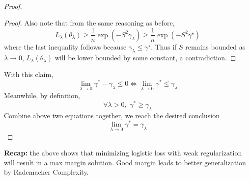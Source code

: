 \documentclass[11pt]{article}
\theoremstyle{definition}
\theoremstyle{remark}
\begin{document}
\begin{proof}
\begin{proof}
Also note that from the same reasoning as before, $$L_{\lambda}(\theta_{\lambda}) \ge \frac{1}{n} \exp(-S^2 \gamma_{\lambda}) \ge \frac{1}{n} \exp(-S^2 \gamma^\star)$$ where the last inequality follows because $\gamma_{\lambda} \le \gamma^\star$. Thus if $S$ remains bounded as $\lambda \rightarrow 0$, $L_{\lambda}(\theta_{\lambda})$ will be lower bounded by some constant, a contradiction. 
\end{proof}
With this claim,
\[
\lim_{\lambda\to 0} \gamma^*-\gamma_\lambda\leq 0 \Longleftrightarrow \lim_{\lambda\to 0} \gamma^* \leq \gamma_\lambda
\]
Meanwhile, by definition,
\[
\forall \lambda > 0, \,\, \gamma^* \geq \gamma_\lambda
\]
Combine above two equations together, we reach the desired conclusion
\[\lim_{\lambda\to 0} \gamma^*=\gamma_\lambda\]
\end{proof}
\textbf{Recap:} the above shows that minimizing logistic loss with weak regularization will result in a max margin solution. Good margin leads to better generalization by Rademacher Complexity.




\end{document}

